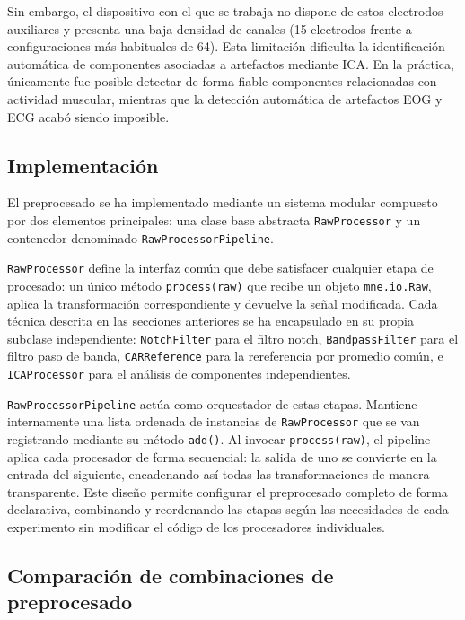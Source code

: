 Sin embargo, el dispositivo con el que se trabaja no dispone de estos electrodos auxiliares y presenta una baja densidad de canales (15 electrodos frente a configuraciones más habituales de 64). Esta limitación dificulta la identificación automática de componentes asociadas a artefactos mediante ICA. En la práctica, únicamente fue posible detectar de forma fiable componentes relacionadas con actividad muscular, mientras que la detección automática de artefactos EOG y ECG acabó siendo imposible.

\subsection{Implementación}
\label{subsec:preprocesado_implementacion}

El preprocesado se ha implementado mediante un sistema modular compuesto por dos elementos principales: una clase base abstracta \texttt{RawProcessor} y un contenedor denominado \texttt{RawProcessorPipeline}.

\texttt{RawProcessor} define la interfaz común que debe satisfacer cualquier etapa de procesado: un único método \texttt{process(raw)} que recibe un objeto \texttt{mne.io.Raw}, aplica la transformación correspondiente y devuelve la señal modificada. Cada técnica descrita en las secciones anteriores se ha encapsulado en su propia subclase independiente: \texttt{NotchFilter} para el filtro notch, \texttt{BandpassFilter} para el filtro paso de banda, \texttt{CARReference} para la rereferencia por promedio común, e \texttt{ICAProcessor} para el análisis de componentes independientes.

\texttt{RawProcessorPipeline} actúa como orquestador de estas etapas. Mantiene internamente una lista ordenada de instancias de \texttt{RawProcessor} que se van registrando mediante su método \texttt{add()}. Al invocar \texttt{process(raw)}, el pipeline aplica cada procesador de forma secuencial: la salida de uno se convierte en la entrada del siguiente, encadenando así todas las transformaciones de manera transparente. Este diseño permite configurar el preprocesado completo de forma declarativa, combinando y reordenando las etapas según las necesidades de cada experimento sin modificar el código de los procesadores individuales.

\subsection{Comparación de combinaciones de preprocesado}
\label{subsec:comparacion_filtros}

